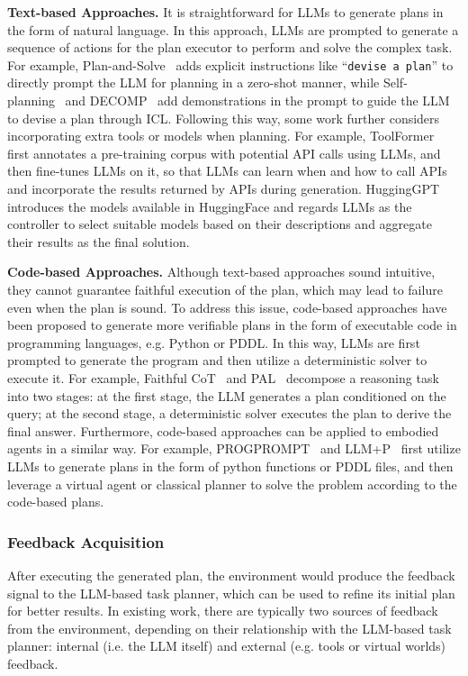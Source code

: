 {{{{{\textbf{Text-based Approaches.} It is straightforward for LLMs to generate plans in the form of natural language. In this approach, LLMs are prompted to generate a sequence of actions for the plan executor to perform and solve the complex task. For example, Plan-and-Solve~\cite{Wang-arXiv-2023-Plan} adds explicit instructions like ``\texttt{devise a plan}'' to directly prompt the LLM for planning in a zero-shot manner, while Self-planning~\cite{Jiang-arXiv-2023-Self} and DECOMP~\cite{Khot-2022-arXiv-Decomposed} add demonstrations in the prompt to guide the LLM to devise a plan through ICL. Following this way, some work further considers incorporating extra tools or models when planning. For example, ToolFormer~\cite{Schick-arxiv-2023-Toolformer} first annotates a pre-training corpus with potential API calls using LLMs, and then fine-tunes LLMs on it,  so that LLMs can learn when and how to call APIs and incorporate the results returned by APIs during generation. HuggingGPT~\cite{Shen-2023-arXiv-Hugginggpt} introduces the models available in HuggingFace and regards LLMs as the controller to select suitable models based on their descriptions and aggregate their results as the final solution.

\textbf{Code-based Approaches.} Although text-based approaches sound intuitive, they cannot guarantee faithful execution of the plan, which may lead to failure even when the plan is sound. To address this issue, code-based approaches have been proposed to generate more verifiable plans in the form of executable code in  programming languages, e.g. Python or PDDL. In this way, LLMs are first prompted to generate the program and then utilize a deterministic solver to execute it. For example, Faithful CoT~\cite{Lyu-arxiv-2023-Faithful} and PAL~\cite{Gao-arxiv-2022-PAL} decompose a reasoning task into two stages: at the first stage, the LLM generates a plan conditioned on the query; at the second stage, a deterministic solver executes the plan to derive the final answer. Furthermore, code-based approaches can be applied to embodied agents in a similar way. For example, PROGPROMPT~\cite{Singh-arxiv-2022-ProgPrompt} and LLM+P~\cite{Liu-2023-arXiv-LLM+P} first utilize LLMs to generate plans in the form of python functions or PDDL files, and then leverage a virtual agent or classical planner to solve the problem according to the code-based plans.

\subsubsection{Feedback Acquisition}
\label{sec:feedback}
After executing the generated plan, the environment would produce the feedback signal to the LLM-based task planner, which can be used to refine its initial plan for better results. In existing work, there are typically two sources of feedback from the environment, depending on their relationship with the LLM-based task planner: internal (i.e. the LLM itself) and external (e.g. tools or virtual worlds) feedback.

}}}}}
